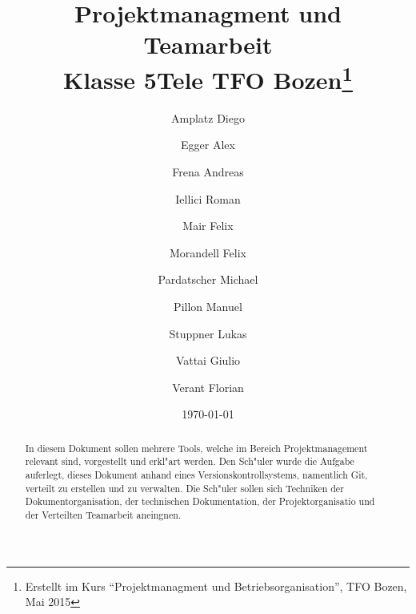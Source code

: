 \documentclass[a4paper]{article}
\title{Projektmanagment und Teamarbeit\\Klasse 5Tele TFO Bozen\thanks{Erstellt 
im Kurs ``Projektmanagment und Betriebsorganisation'', TFO Bozen, Mai 2015}}
\author{Amplatz Diego
\and	Egger Alex
\and	Frena Andreas
\and	Iellici Roman
\and	Mair Felix
\and	Morandell Felix
\and	Pardatscher Michael
\and	Pillon Manuel
\and	Stuppner Lukas
\and	Vattai Giulio
\and	Verant Florian}
\begin{document}
\date{\today}

\maketitle

\begin{abstract}
 In diesem Dokument sollen mehrere Tools, welche im Bereich Projektmanagement relevant sind, vorgestellt und erkl"art werden. Den Sch"uler wurde die Aufgabe auferlegt, dieses Dokument anhand eines Versionskontrollsystems, namentlich Git, verteilt zu erstellen und zu verwalten. Die Sch"uler sollen sich Techniken der Dokumentorganisation, der technischen Dokumentation, der Projektorganisatio und der Verteilten Teamarbeit aneingnen.
\end{abstract}

\newpage


\begin{sloppypar}
\tableofcontents













\end{sloppypar}
\end{document}
